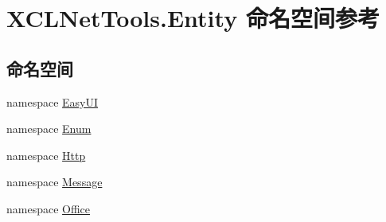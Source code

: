 \hypertarget{namespace_x_c_l_net_tools_1_1_entity}{}\section{X\+C\+L\+Net\+Tools.\+Entity 命名空间参考}
\label{namespace_x_c_l_net_tools_1_1_entity}
\subsection*{命名空间}
\begin{DoxyCompactItemize}
\item 
namespace \hyperlink{namespace_x_c_l_net_tools_1_1_entity_1_1_easy_u_i}{Easy\+UI}
\item 
namespace \hyperlink{namespace_x_c_l_net_tools_1_1_entity_1_1_enum}{Enum}
\item 
namespace \hyperlink{namespace_x_c_l_net_tools_1_1_entity_1_1_http}{Http}
\item 
namespace \hyperlink{namespace_x_c_l_net_tools_1_1_entity_1_1_message}{Message}
\item 
namespace \hyperlink{namespace_x_c_l_net_tools_1_1_entity_1_1_office}{Office}
\end{DoxyCompactItemize}
